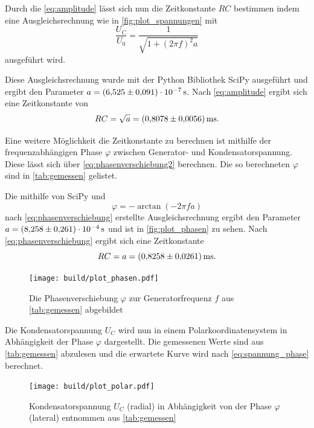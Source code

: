 \FloatBarrier

Durch die \autoref{eq:amplitude} lässt sich nun die Zeitkonstante $RC$ bestimmen indem eine Ausgleichsrechnung wie in \autoref{fig:plot_spannungen} mit
\begin{equation}
    \frac{U_C}{U_0} = \frac{1}{\sqrt{1+(2 \pi f)^2a}}
\end{equation} 
ausgeführt wird.

Diese Ausgleichsrechnung wurde mit der Python Bibliothek SciPy\cite{scipy} ausgeführt und ergibt den Parameter $a = \SI{6.525+-0.091e-7}{\second}$. Nach \autoref{eq:amplitude} ergibt sich eine Zeitkonstante von
\begin{equation}
    RC = \sqrt{a} = \SI{0.8078+-0.0056}{\milli\second}.
\end{equation}

\FloatBarrier

Eine weitere Möglichkeit die Zeitkonstante zu berechnen ist mithilfe der frequenzabhängigen Phase $\varphi$ zwischen Generator- und Kondensatorspannung. Diese lässt sich über \autoref{eq:phasenverschiebung2} berechnen. Die so berechneten $\varphi$ sind in \autoref{tab:gemessen} gelistet.

Die mithilfe von SciPy\cite{scipy} und
\begin{equation}
    \varphi=-\arctan(-2\pi f a)
\end{equation}
nach \autoref{eq:phasenverschiebung} erstellte Ausgleichsrechnung ergibt den Parameter $a=\SI{8.258+-0.261e-4}{\second}$ und ist in \autoref{fig:plot_phasen} zu sehen. Nach \autoref{eq:phasenverschiebung} ergibt sich eine Zeitkonstante
\begin{equation}
    RC = a = \SI{0.8258+-0.0261}{\milli\second}.
\end{equation}

\begin{figure}
    \centering
    \texttt{[image: build/plot\_phasen.pdf]}
    \caption{Die Phasenverschiebung $\varphi$ zur Generatorfrequenz $f$ aus \autoref{tab:gemessen} abgebildet}
    \label{fig:plot_phasen}
\end{figure}
Die Kondensatorspannung $U_C$ wird nun in einem Polarkoordinatensystem in Abhängigkeit der Phase $\varphi$ dargestellt. Die gemessenen Werte sind aus \autoref{tab:gemessen} abzulesen und die erwartete Kurve wird nach \autoref{eq:spannung_phase} berechnet.
\begin{figure}[H]
    \centering
    \texttt{[image: build/plot\_polar.pdf]}
    \caption{Kondensatorspannung $U_C$ (radial) in Abhängigkeit von der Phase $\varphi$ (lateral) entnommen aus \autoref{tab:gemessen}}
    \label{fig:plot_polar}
\end{figure}
\FloatBarrier
